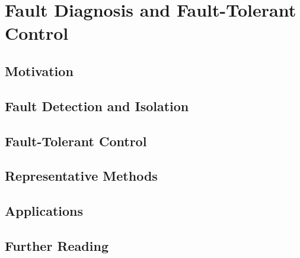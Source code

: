 \chapter{Fault Diagnosis and Fault-Tolerant Control} \label{ch:fdi_ftc}
		
	\section{Motivation}

    \section{Fault Detection and Isolation}

    \section{Fault-Tolerant Control}

   	\section{Representative Methods}
	
	\section{Applications}

    \section{Further Reading}